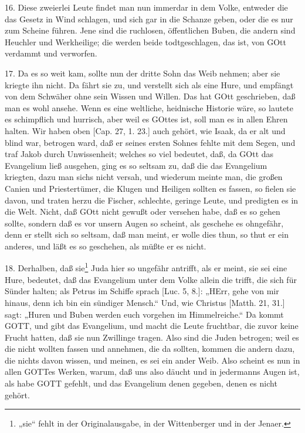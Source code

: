 16. Diese zweierlei Leute findet man nun immerdar in dem Volke, entweder die das Gesetz in Wind schlagen, und sich gar in die Schanze geben, oder die es nur zum Scheine führen. Jene sind die ruchlosen, öffentlichen Buben, die andern sind Heuchler und Werkheilige; die werden beide todtgeschlagen, das ist, von GOtt verdammt und verworfen.

17. Da es so weit kam, sollte nun der dritte Sohn das Weib nehmen; aber sie kriegte ihn nicht. Da fährt sie zu, und verstellt sich als eine Hure, und empfängt von dem Schwäher ohne sein Wissen und Willen. Das hat GOtt geschrieben, daß man es wohl ansehe. Wenn es eine weltliche, heidnische Historie wäre, so lautete es schimpflich und hurrisch, aber weil es GOttes ist, soll man es in allen Ehren halten. Wir haben oben [Cap. 27, 1. 23.] auch gehört, wie Isaak, da er alt und blind war, betrogen ward, daß er seines ersten Sohnes fehlte mit dem Segen, und traf Jakob durch Unwissenheit; welches so viel bedeutet, daß, da GOtt das Evangelium ließ ausgehen, ging es so seltsam zu, daß die das Evangelium kriegten, dazu man sichs nicht versah, und wiederum meinte man, die großen Canien und Priestertümer, die Klugen und Heiligen sollten es fassen, so fielen sie davon, und traten herzu die Fischer, schlechte, geringe Leute, und predigten es in die Welt. Nicht, daß GOtt nicht gewußt oder versehen habe, daß es so gehen sollte, sondern daß es vor unsern Augen so scheint, als geschehe es ohngefähr, denn er stellt sich so seltsam, daß man meint, er wolle dies thun, so thut er ein anderes, und läßt es so geschehen, als müßte er es nicht.

18. Derhalben, daß sie\footnote{„sie“ fehlt in der Originalausgabe, in der Wittenberger und in der Jenaer.} Juda hier so ungefähr antrifft, als er meint, sie sei eine Hure, bedeutet, daß das Evangelium unter dem Volke allein die trifft, die sich für Sünder halten; als Petrus im Schiffe sprach [Luc. 5, 8.]: „HErr, gehe von mir hinaus, denn ich bin ein sündiger
Mensch.“ Und, wie Christus [Matth. 21, 31.] sagt: „Huren und Buben werden euch vorgehen im Himmelreiche.“ Da kommt GOTT, und gibt das Evangelium, und macht die Leute fruchtbar, die zuvor keine Frucht hatten, daß sie nun Zwillinge tragen. Also sind die Juden betrogen; weil es die nicht wollten fassen und annehmen, die da sollten, kommen die andern dazu, die nichts davon wissen, und meinen, es sei ein ander Weib. Also scheint es nun in allen GOTTes Werken, warum, daß uns also däucht und in jedermanns Augen ist, als habe GOTT gefehlt, und das Evangelium denen gegeben, denen es nicht gehört.

